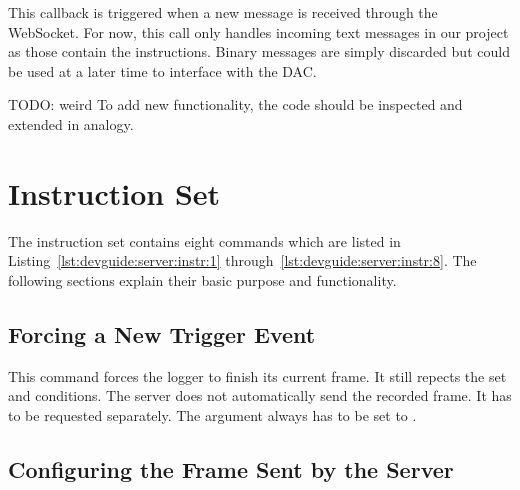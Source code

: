 This  callback  is triggered  when  a  new  message  is received  through  the
WebSocket.  For  now, this  call only  handles incoming  text messages  in our
project  as  those  contain  the instructions.   Binary  messages  are  simply
discarded but could be used at a later time to interface with the DAC.

TODO: weird
To add  new functionality,  the code should  be inspected and  extended in
analogy.

\section{Instruction Set} %
\label{sec:devguide:server:instruction}

The        instruction        set        contains        eight        commands
which     are      listed     in     Listing~\ref{lst:devguide:server:instr:1}
through~\ref{lst:devguide:server:instr:8}. The   following  sections   explain
their basic purpose and functionality.

\subsection{Forcing a New Trigger Event} %
\label{subsec:devguide:server:forcing_trigger}

This  command  forces  the  logger  to  finish  its  current  frame. It  still
repects the  set   and  conditions.   The server  does not
automatically send the recorded frame. It has to be requested separately.  The
argument  always has to be set to .


\subsection{Configuring the Frame Sent by the Server } %
\label{subsec:devguide:server:config_frame}

